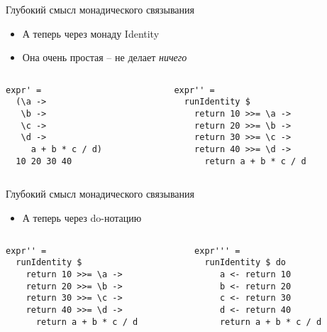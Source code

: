 \documentclass{beamer}
\begin{document}
  \begin{frame}[fragile]{Глубокий смысл монадического связывания}
      \begin{itemize}
          \item А теперь через монаду Identity
          \item Она очень простая -- не делает \textit{ничего}
      \end{itemize}
      \begin{columns}
        \begin{column}{0.5\textwidth}
\begin{verbatim}
expr' =
  (\a ->
   \b ->
   \c ->
   \d ->
     a + b * c / d)
  10 20 30 40
\end{verbatim}
        \end{column}
        \begin{column}{0.5\textwidth}
\begin{verbatim}
expr'' =
  runIdentity $
    return 10 >>= \a ->
    return 20 >>= \b ->
    return 30 >>= \c ->
    return 40 >>= \d ->
      return a + b * c / d
\end{verbatim}
        \end{column}
      \end{columns}
  \end{frame}
  \begin{frame}[fragile]{Глубокий смысл монадического связывания}
      \begin{itemize}
          \item А теперь через do-нотацию
      \end{itemize}
      \begin{columns}
        \begin{column}{0.5\textwidth}
\begin{verbatim}
expr'' =
  runIdentity $
    return 10 >>= \a ->
    return 20 >>= \b ->
    return 30 >>= \c ->
    return 40 >>= \d ->
      return a + b * c / d
\end{verbatim}
        \end{column}
        \begin{column}{0.5\textwidth}
\begin{verbatim}
expr''' =
  runIdentity $ do
     a <- return 10
     b <- return 20
     c <- return 30
     d <- return 40
     return a + b * c / d
\end{verbatim}
        \end{column}
      \end{columns}
\end{frame}
\end{document}
